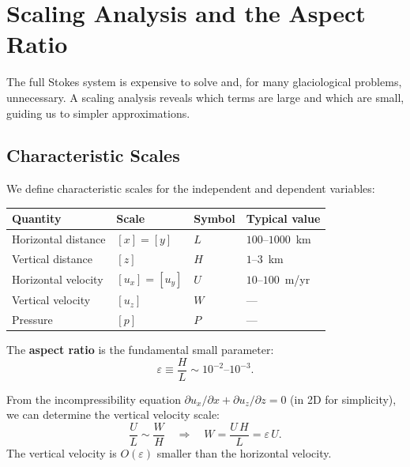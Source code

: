 \documentclass[11pt]{article}
\begin{document}
\section{Scaling Analysis and the Aspect Ratio}

The full Stokes system is expensive to solve and, for many glaciological problems, unnecessary.  A scaling analysis reveals which terms are large and which are small, guiding us to simpler approximations.

\subsection{Characteristic Scales}

We define characteristic scales for the independent and dependent variables:
\begin{center}
\begin{tabular}{llll}
  \toprule
  Quantity & Scale & Symbol & Typical value \\
  \midrule
  Horizontal distance & $[x] = [y]$ & $L$ & $100$--$1000$~km \\
  Vertical distance & $[z]$ & $H$ & $1$--$3$~km \\
  Horizontal velocity & $[u_x] = [u_y]$ & $U$ & $10$--$100$~m/yr \\
  Vertical velocity & $[u_z]$ & $W$ & --- \\
  Pressure & $[p]$ & $P$ & --- \\
  \bottomrule
\end{tabular}
\end{center}

\noindent The \textbf{aspect ratio} is the fundamental small parameter:
\begin{equation}
  \varepsilon \equiv \frac{H}{L} \sim 10^{-2}\text{--}10^{-3}.
  \label{eq:aspect_ratio}
\end{equation}

\noindent From the incompressibility equation $\partial u_x/\partial x + \partial u_z/\partial z = 0$ (in 2D for simplicity), we can determine the vertical velocity scale:
\begin{equation}
  \frac{U}{L} \sim \frac{W}{H} \quad\Longrightarrow\quad W = \frac{U\,H}{L} = \varepsilon\,U.
  \label{eq:W_scale}
\end{equation}
The vertical velocity is $O(\varepsilon)$ smaller than the horizontal velocity.
\end{document}
